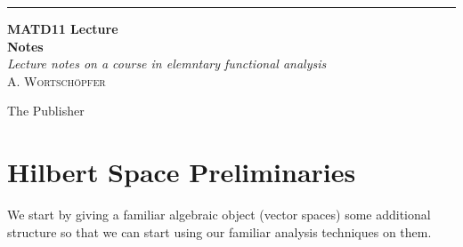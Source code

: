 \documentclass[a4paper, 11pt]{book}
\newcommand*{\plogo}{\fbox{$\mathcal{DB}$}}
\theoremstyle{definition}
\theoremstyle{remark}
\begin{document}
    \begin{titlepage} 
        \raggedleft

        \rule{1pt}{\textheight} %
        \hspace{0.05\textwidth} %
        \parbox[b]{0.75\textwidth}{ %
                            
            {\Huge\bfseries MATD11 Lecture \\[0.5\baselineskip] Notes }\\[2\baselineskip] %
            {\large\textit{Lecture notes on a course in elemntary functional analysis}}\\[4\baselineskip] %
            {\Large\textsc{A. Wortschöpfer}} %
                                                    
            \vspace{0.5\textheight} %
                                                            
            {\noindent The Publisher~~\plogo}\\[\baselineskip] %
        }
    \end{titlepage}

    \chapter{Hilbert Space Preliminaries}

    We start by giving a familiar algebraic object (vector spaces) some additional structure so that we can start using our
    familiar analysis techniques on them.
\end{document}

